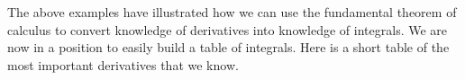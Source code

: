 \begin{eg}

\end{eg}

The above examples have illustrated how we can use the fundamental
theorem of calculus to convert knowledge of derivatives into
knowledge of integrals.
We are now in a position to easily build a table of integrals. Here is
a short table of the most important derivatives that we know.

